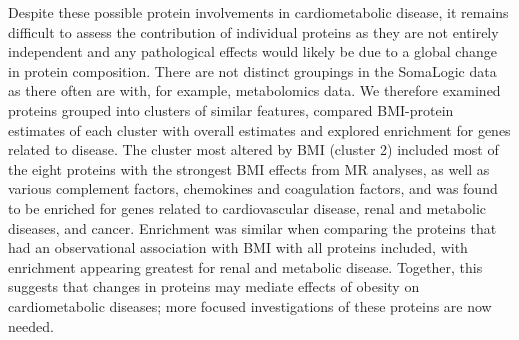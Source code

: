 \documentclass[11pt,twoside]{bristolthesis}
\begin{document}
Despite these possible protein involvements in cardiometabolic disease, it remains difficult to assess the contribution of individual proteins as they are not entirely independent and any pathological effects would likely be due to a global change in protein composition. There are not distinct groupings in the SomaLogic data as there often are with, for example, metabolomics data. We therefore examined proteins grouped into clusters of similar features, compared BMI-protein estimates of each cluster with overall estimates and explored enrichment for genes related to disease. The cluster most altered by BMI (cluster 2) included most of the eight proteins with the strongest BMI effects from MR analyses, as well as various complement factors, chemokines and coagulation factors, and was found to be enriched for genes related to cardiovascular disease, renal and metabolic diseases, and cancer. Enrichment was similar when comparing the proteins that had an observational association with BMI with all proteins included, with enrichment appearing greatest for renal and metabolic disease. Together, this suggests that changes in proteins may mediate effects of obesity on cardiometabolic diseases; more focused investigations of these proteins are now needed.
\end{document}
